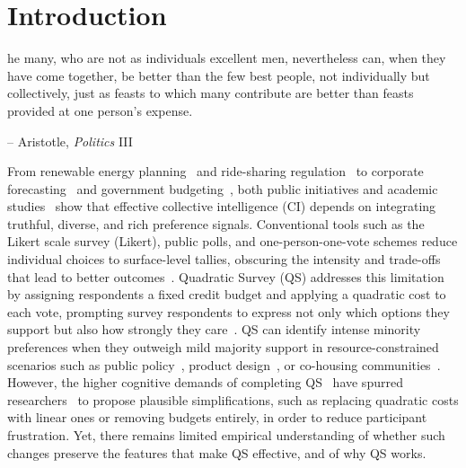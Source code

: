 \section{Introduction}

\begin{displayquote}
[T]he many, who are not as individuals excellent men, nevertheless can, when they have come together, be better than the few best people, not individually but collectively, just as feasts to which many contribute are better than feasts provided at one person's expense.

\begin{flushright}
-- Aristotle, \textit{Politics} III
\end{flushright}
\end{displayquote}

From renewable energy planning~\cite{fishkinConsultingPublicDeliberative2003} and ride-sharing regulation~\cite{hsiao2018vtaiwan} to corporate forecasting~\cite{cowgill2015corporate} and government budgeting~\cite{desousasantosParticipatoryBudgetingPorto1998}, both public initiatives and academic studies~\cite{woolley2010evidence, centola2022network, krosnick1999survey, weylPluralityFutureCollaborative2024} show that effective collective intelligence (CI) depends on integrating truthful, diverse, and rich preference signals. Conventional tools such as the Likert scale survey (Likert), public polls, and one-person-one-vote schemes reduce individual choices to surface-level tallies, obscuring the intensity and trade-offs that lead to better outcomes~\cite{quarfoot2017quadratic,posner2017quadratic, krosnick1999survey}. Quadratic Survey (QS) addresses this limitation by assigning respondents a fixed credit budget and applying a quadratic cost to each vote, prompting survey respondents to express not only which options they support but also how strongly they care~\cite{chengCanShowWhat2021, quarfoot2017quadratic, cavaille2024cares}. QS can identify intense minority preferences when they outweigh mild majority support in resource-constrained scenarios such as public policy~\cite{chengCanShowWhat2021, quarfoot2017quadratic}, product design~\cite{chengCanShowWhat2021}, or co-housing communities~\cite{karpinskiPotentialQuadraticVoting2025}. However, the higher cognitive demands of completing QS~\cite{chengOrganizeThenVote2025} have spurred researchers~\cite{cavaille2024cares, chengCanShowWhat2021} to propose plausible simplifications, such as replacing quadratic costs with linear ones or removing budgets entirely, in order to reduce participant frustration. Yet, there remains limited empirical understanding of whether such changes preserve the features that make QS effective, and of why QS works.

